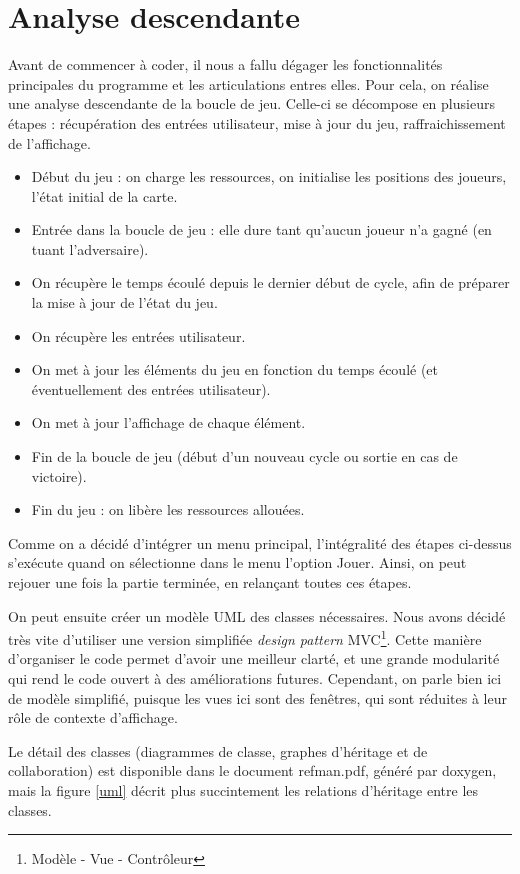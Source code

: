 \documentclass[a4paper,10pt]{report}
\begin{document}
\section{Analyse descendante}
Avant de commencer à coder, il nous a fallu dégager les fonctionnalités principales du programme et les articulations entres elles. Pour cela, on réalise une analyse descendante de la boucle de jeu. Celle-ci se décompose en plusieurs étapes : récupération des entrées utilisateur, mise à jour du jeu, raffraichissement de l'affichage.
\begin{itemize}
 \item Début du jeu : on charge les ressources, on initialise les positions des joueurs, l'état initial de la carte.
 \item Entrée dans la boucle de jeu : elle dure tant qu'aucun joueur n'a gagné (en tuant l'adversaire).
 \item On récupère le temps écoulé depuis le dernier début de cycle, afin de préparer la mise à jour de l'état du jeu.
 \item On récupère les entrées utilisateur.
 \item On met à jour les éléments du jeu en fonction du temps écoulé (et éventuellement des entrées utilisateur).
 \item On met à jour l'affichage de chaque élément.
 \item Fin de la boucle de jeu (début d'un nouveau cycle ou sortie en cas de victoire).
 \item Fin du jeu : on libère les ressources allouées.
\end{itemize}
Comme on a décidé d'intégrer un menu principal, l'intégralité des étapes ci-dessus s'exécute quand on sélectionne dans le menu l'option Jouer. Ainsi, on peut rejouer une fois la partie terminée, en relançant toutes ces étapes. 

On peut ensuite créer un modèle UML des classes nécessaires. Nous avons décidé très vite d'utiliser une version simplifiée \textit{design pattern} MVC\footnote{Modèle - Vue - Contrôleur}. Cette manière d'organiser le code permet d'avoir une meilleur clarté, et une grande modularité qui rend le code ouvert à des améliorations futures. Cependant, on parle bien ici de modèle simplifié, puisque les vues ici sont des fenêtres, qui sont réduites à leur rôle de contexte d'affichage.

Le détail des classes (diagrammes de classe, graphes d'héritage et de collaboration) est disponible dans le document refman.pdf, généré par doxygen, mais la figure \ref{uml} décrit plus succintement les relations d'héritage entre les classes.
\end{document}
